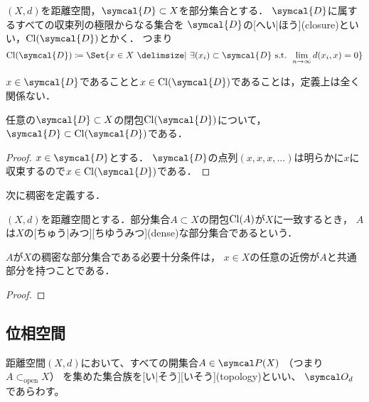 \documentclass[../sotsu.tex]{subfiles}
\begin{document}
\begin{definition}[閉包]
    \label{dfn:closure-by-sequence}
    $(X, d)$を距離空間，$\symcal{D} \subset X$を部分集合とする．
    $\symcal{D}$に属するすべての収束列の極限からなる集合を
    $\symcal{D}$の[へい|ほう](closure)といい，$\cl{\symcal{D}}$とかく．
    つまり
    \begin{equation}
        \cl{\symcal{D}} \coloneq \Set{ x \in X  \given  \exists (x_i) \subset \symcal{D} \text{ s.t. } \lim_{n \to \infty} d(x_i, x) = 0 }
    \end{equation}
\end{definition}

$x \in \symcal{D}$であることと$x \in \cl{\symcal{D}}$であることは，定義上は全く関係ない．

\begin{corollary}
    任意の$\symcal{D} \subset X$の閉包$\cl{\symcal{D}}$について，
    $\symcal{D} \subset \cl{\symcal{D}}$である．
\end{corollary}

\begin{proof}
    $x \in \symcal{D}$とする．
    $\symcal{D}$の点列$(x, x, x, \dotsc)$は明らかに$x$に収束するので$x \in \cl{\symcal{D}}$である．
\end{proof}

次に稠密を定義する．

\begin{definition}[稠密]
    $(X, d)$を距離空間とする．部分集合$A \subset X$の閉包$\mathrm{Cl}(A)$が$X$に一致するとき，
    $A$は$X$の[ちゅう|みつ][ちゆうみつ](dense)な部分集合であるという．
\end{definition}

\begin{proposition}
    $A$が$X$の稠密な部分集合である必要十分条件は，
    $x \in X$の任意の近傍が$A$と共通部分を持つことである．
\end{proposition}

\begin{proof}
    
\end{proof}


\subsection{位相空間}

\begin{definition}
    \label{dfn:topology}
    距離空間$(X, d)$において、すべての開集合$A \in \pset(X)$
    （つまり$A \subset_{\text{open}} X$）
    を集めた集合族を[い|そう][いそう](topology)といい、
    $\topology_d$であらわす。
\end{definition}
\end{document}
